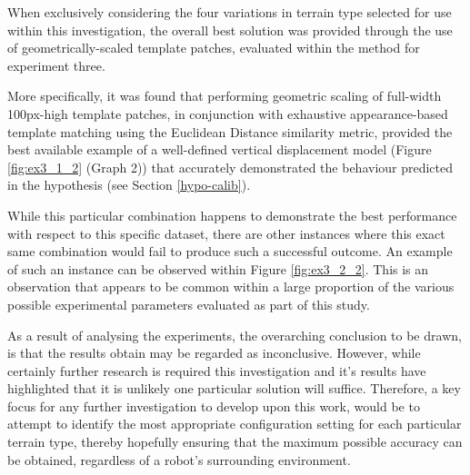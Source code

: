When exclusively considering the four variations in terrain type selected for use within this investigation, the overall best solution was provided through the use of geometrically-scaled template patches, evaluated within the method for experiment three.

More specifically, it was found that performing geometric scaling of full-width 100px-high template patches, in conjunction with exhaustive appearance-based template matching using the Euclidean Distance similarity metric, provided the best available example of a well-defined vertical displacement model (Figure \ref{fig:ex3_1_2} (Graph 2)) that accurately demonstrated the behaviour predicted in the hypothesis (see Section \ref{hypo-calib}).

While this particular combination happens to demonstrate the best performance with respect to this specific dataset, there are other instances where this exact same combination would fail to produce such a successful outcome. An example of such an instance can be observed within Figure \ref{fig:ex3_2_2}. This is an observation that appears to be common within a large proportion of the various possible experimental parameters evaluated as part of this study. 

As a result of analysing the experiments, the overarching conclusion to be drawn, is that the results obtain may be regarded as inconclusive. However, while certainly further research is required this investigation and it's results have highlighted that it is unlikely one particular solution will suffice. Therefore, a key focus for any further investigation to develop upon this work, would be to attempt to identify the most appropriate configuration setting for each particular terrain type, thereby hopefully ensuring that the maximum possible accuracy can be obtained, regardless of a robot's surrounding environment. 
  

 
  

